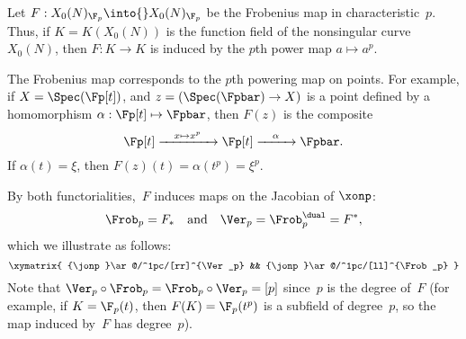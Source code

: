 \documentclass{report}
\begin{document}
Let $F:X_0(N)_{\F_p}\into{}X_0(N)_{\F_p}$ be the Frobenius map in
characteristic~$p$.
Thus, if $K=K(X_0(N))$ is the function field of the nonsingular
curve $X_0(N)$, then $F:K\to K$ is induced by the $p$th power map
$a\mapsto{}a^p$.
\begin{remark}
The Frobenius map corresponds to the $p$th powering map on points.
For example, if $X=\Spec(\Fp[t])$, and $z=(\Spec(\Fpbar)\to X)$ is a
point defined by a homomorphism $\alpha:\Fp[t]\mapsto \Fpbar$, then
$F(z)$ is the composite
$$\Fp[t] \xrightarrow{\quad x\mapsto x^p\quad }
   \Fp[t] \xrightarrow{\quad \alpha\quad } \Fpbar.$$
If $\alpha(t) = \xi$, then $F(z)(t) = \alpha(t^p) = \xi^p$.
\end{remark}

By both functorialities,~$F$ induces maps on the Jacobian of
$\xonp$:
\[
  \Frob_p=F_{*}\quad\text{and}\quad\Ver_p=\Frob_p^{\dual}=F^{*},
\]
which we illustrate as follows:
\[
  \xymatrix{
   {\jonp}\ar@/^1pc/[rr]^{\Ver_p} && {\jonp}\ar@/^1pc/[ll]^{\Frob_p}
  }
\]
Note that $\Ver_p\circ\Frob_p=\Frob_p\circ\Ver_p=[p]$ since~$p$ is the
degree of~$F$ (for example, if $K=\F_p(t)$, then $F(K)=\F_p(t^p)$
is a subfield of degree~$p$, so the map induced by~$F$
has degree~$p$).
\end{document}
